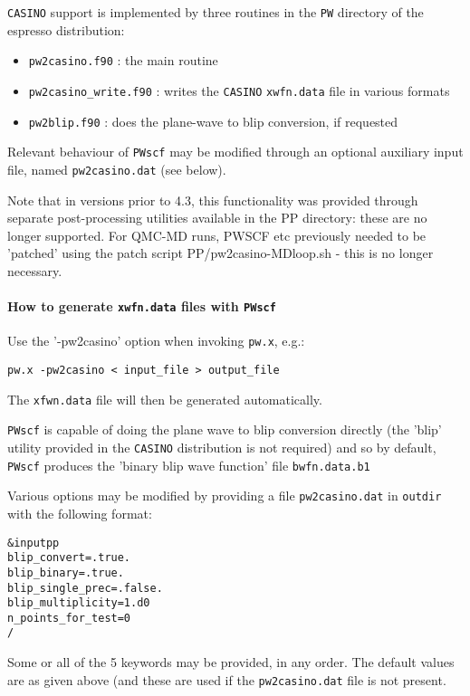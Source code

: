 \documentclass[12pt,a4paper]{article}
\begin{document}
\texttt{CASINO} support is implemented by three routines in the \texttt{PW} directory of the
espresso distribution: 
\begin{itemize}
\item \texttt{pw2casino.f90} : the main routine     
\item \texttt{pw2casino\_write.f90} : writes the \texttt{CASINO} \texttt{xwfn.data} file in various formats
\item \texttt{pw2blip.f90} : does the plane-wave to blip conversion, if requested
\end{itemize}
Relevant behaviour of \texttt{PWscf} may be modified through an optional auxiliary input 
file, named \texttt{pw2casino.dat} (see below).

Note that in versions prior to 4.3, this functionality was provided through
separate post-processing utilities available in the PP directory: these are 
no longer supported. For QMC-MD runs, PWSCF etc previously needed to be 
'patched' using the patch script PP/pw2casino-MDloop.sh - this is no longer 
necessary.

\paragraph{How to generate \texttt{xwfn.data} files with \texttt{PWscf}}
Use the '-pw2casino' option when invoking \texttt{pw.x}, e.g.: 
\begin{verbatim}
pw.x -pw2casino < input_file > output_file
\end{verbatim}
The \texttt{xfwn.data} file will then be generated automatically. 

\texttt{PWscf} is capable of doing the plane wave to blip conversion directly (the
'blip' utility provided in the \texttt{CASINO} distribution is not required) and so by
default, \texttt{PWscf} produces the 'binary blip wave function' file \texttt{bwfn.data.b1}

Various options may be modified by providing a file \texttt{pw2casino.dat} in \texttt{outdir}
with the following format: 
\begin{verbatim}
&inputpp
blip_convert=.true.
blip_binary=.true.
blip_single_prec=.false.
blip_multiplicity=1.d0
n_points_for_test=0
/
\end{verbatim}
Some or all of the 5 keywords may be provided, in any order. The default
values are as given above (and these are used if the \texttt{pw2casino.dat} file is
not present.
\end{document}
